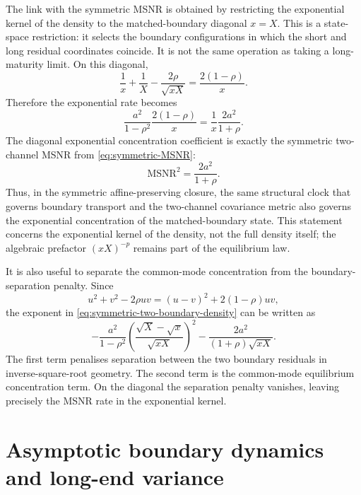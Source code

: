 \documentclass[11pt]{article}
\numberwithin{equation}{section}
\begin{document}
The link with the symmetric MSNR is obtained by restricting the exponential kernel of the density to the matched-boundary diagonal \(x=X\). This is a state-space restriction: it selects the boundary configurations in which the short and long residual coordinates coincide. It is not the same operation as taking a long-maturity limit. On this diagonal,
\[
\frac1x+
\frac1X-
\frac{2\rho}{\sqrt{xX}}
=
\frac{2(1-\rho)}{x}.
\]
Therefore the exponential rate becomes
\begin{equation}
\label{eq:diagonal-density-msnr-rate}
\frac{a^2}{1-\rho^2}\frac{2(1-\rho)}{x}
=
\frac1x\frac{2a^2}{1+\rho}.
\end{equation}
The diagonal exponential concentration coefficient is exactly the symmetric two-channel MSNR from \eqref{eq:symmetric-MSNR}:
\begin{equation}
\label{eq:density-msnr-identity}
\boxed{
\mathrm{MSNR}^2=\frac{2a^2}{1+\rho}.
}
\end{equation}
Thus, in the symmetric affine-preserving closure, the same structural clock that governs boundary transport and the two-channel covariance metric also governs the exponential concentration of the matched-boundary state. This statement concerns the exponential kernel of the density, not the full density itself; the algebraic prefactor \((xX)^{-p}\) remains part of the equilibrium law.

It is also useful to separate the common-mode concentration from the boundary-separation penalty. Since
\[
u^2+v^2-2\rho uv=(u-v)^2+2(1-\rho)uv,
\]
the exponent in \eqref{eq:symmetric-two-boundary-density} can be written as
\begin{equation}
\label{eq:separation-penalty-density}
-\frac{a^2}{1-\rho^2}
\left(
\frac{\sqrt{X}-\sqrt{x}}{\sqrt{xX}}
\right)^2
-
\frac{2a^2}{(1+\rho)\sqrt{xX}}.
\end{equation}
The first term penalises separation between the two boundary residuals in inverse-square-root geometry. The second term is the common-mode equilibrium concentration term. On the diagonal the separation penalty vanishes, leaving precisely the MSNR rate in the exponential kernel.

\section{Asymptotic boundary dynamics and long-end variance}
\end{document}
